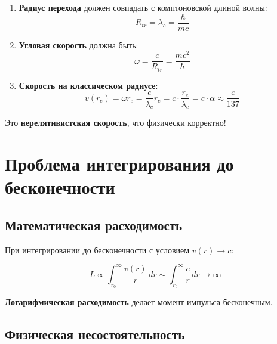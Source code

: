 \documentclass[12pt,a4paper]{article}
\begin{document}
\begin{enumerate}
    \item \textbf{Радиус перехода} должен совпадать с комптоновской длиной волны:
    \begin{equation}
        R_{tr} = \lambda_c = \frac{\hbar}{m c}
    \end{equation}

    \item \textbf{Угловая скорость} должна быть:
    \begin{equation}
        \omega = \frac{c}{R_{tr}} = \frac{m c^2}{\hbar}
    \end{equation}

    \item \textbf{Скорость на классическом радиусе}:
    \begin{equation}
        v(r_e) = \omega r_e = \frac{c}{\lambda_c} r_e = c \cdot \frac{r_e}{\lambda_c} = c \cdot \alpha \approx \frac{c}{137}
    \end{equation}
\end{enumerate}

Это \textbf{нерелятивистская скорость}, что физически корректно!

\section{Проблема интегрирования до бесконечности}

\subsection{Математическая расходимость}

При интегрировании до бесконечности с условием $v(r) \to c$:

\begin{equation}
    L \propto \int_{r_0}^{\infty} \frac{v(r)}{r} \, dr \sim \int_{r_0}^{\infty} \frac{c}{r} \, dr \to \infty
\end{equation}

\textbf{Логарифмическая расходимость} делает момент импульса бесконечным.

\subsection{Физическая несостоятельность}
\end{document}

